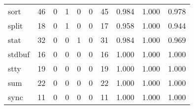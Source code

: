 \begin{longtable}{lp{2.0cm}p{2.0cm}p{2.0cm}p{2.0cm}p{2.0cm}p{2.0cm}p{2.0cm}p{2.0cm}p{2.0cm}}
sort      &                     46 &                                             0 &                                            1 &                                           0 &                                            0 &                                         45 &                                0.984 &                                  1.000 &                                0.978 \\
split     &                     18 &                                             0 &                                            1 &                                           0 &                                            0 &                                         17 &                                0.958 &                                  1.000 &                                0.944 \\
stat      &                     32 &                                             0 &                                            0 &                                           1 &                                            0 &                                         31 &                                0.984 &                                  1.000 &                                0.969 \\
stdbuf    &                     16 &                                             0 &                                            0 &                                           0 &                                            0 &                                         16 &                                1.000 &                                  1.000 &                                1.000 \\
stty      &                     19 &                                             0 &                                            0 &                                           0 &                                            0 &                                         19 &                                1.000 &                                  1.000 &                                1.000 \\
sum       &                     22 &                                             0 &                                            0 &                                           0 &                                            0 &                                         22 &                                1.000 &                                  1.000 &                                1.000 \\
sync      &                     11 &                                             0 &                                            0 &                                           0 &                                            0 &                                         11 &                                1.000 &                                  1.000 &                                1.000 \\

\end{longtable}
